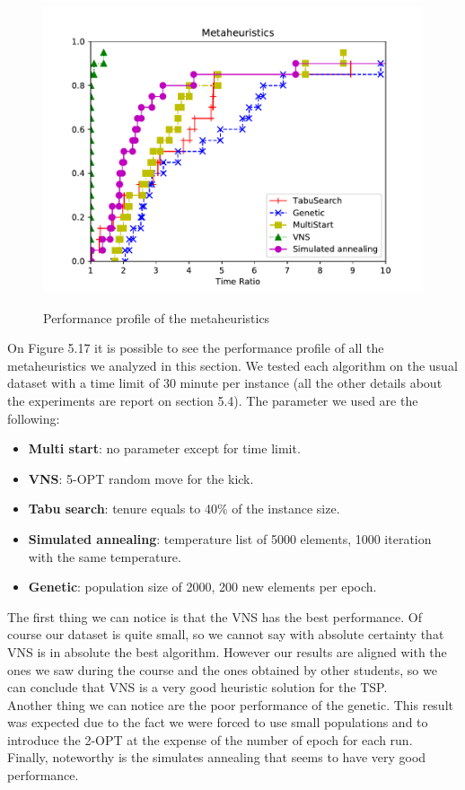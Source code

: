 \begin{figure}[h!]
\centering
	\includegraphics[scale=1]{media/metaheuristics.pdf} \\
	\caption{Performance profile of the metaheuristics}
\end{figure}

On Figure 5.17 it is possible to see the performance profile of all the metaheuristics we analyzed in this section. We tested each algorithm on the usual dataset with a time limit of 30 minute per instance (all the other details about the experiments are report on section 5.4). The parameter we used are the following:

\begin{itemize}
	\item \textbf{Multi start}: no parameter except for time limit.
	\item \textbf{VNS}: 5-OPT random move for the kick.
	\item \textbf{Tabu search}: tenure equals to 40\% of the instance size.
	\item \textbf{Simulated annealing}: temperature list of 5000 elements, 1000 iteration with the same temperature.
	\item \textbf{Genetic}: population size of 2000, 200 new elements per epoch. 
\end{itemize}

\noindent The first thing we can notice is that the VNS has the best performance. Of course our dataset is quite small, so we cannot say with absolute certainty that VNS is in absolute the best algorithm. However our results are aligned with the ones we saw during the course and the ones obtained by other students, so we can conclude that VNS is a very good heuristic solution for the TSP. \\
Another thing we can notice are the poor performance of the genetic. This result was expected due to the fact we were forced to use small populations and to introduce the 2-OPT at the expense of the number of epoch for each run. \\
Finally, noteworthy is the simulates annealing that seems to have very good performance.

